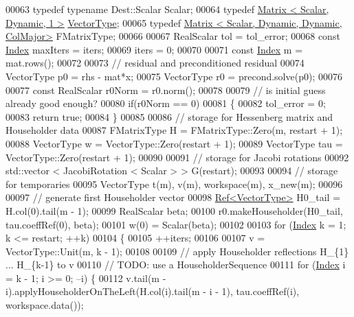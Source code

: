 \begin{DoxyCode}
00063   \textcolor{keyword}{typedef} \textcolor{keyword}{typename} Dest::Scalar Scalar;
00064   \textcolor{keyword}{typedef} \hyperlink{group___core___module}{Matrix < Scalar, Dynamic, 1 >} \hyperlink{struct_vector_type}{VectorType};
00065   \textcolor{keyword}{typedef} \hyperlink{group___core___module_class_eigen_1_1_matrix}{Matrix < Scalar, Dynamic, Dynamic, ColMajor>} 
      FMatrixType;
00066 
00067   RealScalar tol = tol\_error;
00068   \textcolor{keyword}{const} \hyperlink{namespace_eigen_a62e77e0933482dafde8fe197d9a2cfde}{Index} maxIters = iters;
00069   iters = 0;
00070 
00071   \textcolor{keyword}{const} \hyperlink{namespace_eigen_a62e77e0933482dafde8fe197d9a2cfde}{Index} m = mat.rows();
00072 
00073   \textcolor{comment}{// residual and preconditioned residual}
00074   VectorType p0 = rhs - mat*x;
00075   VectorType r0 = precond.solve(p0);
00076 
00077   \textcolor{keyword}{const} RealScalar r0Norm = r0.norm();
00078 
00079   \textcolor{comment}{// is initial guess already good enough?}
00080   \textcolor{keywordflow}{if}(r0Norm == 0)
00081   \{
00082     tol\_error = 0;
00083     \textcolor{keywordflow}{return} \textcolor{keyword}{true};
00084   \}
00085 
00086   \textcolor{comment}{// storage for Hessenberg matrix and Householder data}
00087   FMatrixType H   = FMatrixType::Zero(m, restart + 1);
00088   VectorType w    = VectorType::Zero(restart + 1);
00089   VectorType tau  = VectorType::Zero(restart + 1);
00090 
00091   \textcolor{comment}{// storage for Jacobi rotations}
00092   std::vector < JacobiRotation < Scalar > > G(restart);
00093   
00094   \textcolor{comment}{// storage for temporaries}
00095   VectorType t(m), v(m), workspace(m), x\_new(m);
00096 
00097   \textcolor{comment}{// generate first Householder vector}
00098   \hyperlink{group___core___module_class_eigen_1_1_ref}{Ref<VectorType>} H0\_tail = H.col(0).tail(m - 1);
00099   RealScalar beta;
00100   r0.makeHouseholder(H0\_tail, tau.coeffRef(0), beta);
00101   w(0) = Scalar(beta);
00102   
00103   \textcolor{keywordflow}{for} (\hyperlink{namespace_eigen_a62e77e0933482dafde8fe197d9a2cfde}{Index} k = 1; k <= restart; ++k)
00104   \{
00105     ++iters;
00106 
00107     v = VectorType::Unit(m, k - 1);
00108 
00109     \textcolor{comment}{// apply Householder reflections H\_\{1\} ... H\_\{k-1\} to v}
00110     \textcolor{comment}{// TODO: use a HouseholderSequence}
00111     \textcolor{keywordflow}{for} (\hyperlink{namespace_eigen_a62e77e0933482dafde8fe197d9a2cfde}{Index} i = k - 1; i >= 0; --i) \{
00112       v.tail(m - i).applyHouseholderOnTheLeft(H.col(i).tail(m - i - 1), tau.coeffRef(i), workspace.data());

\end{DoxyCode}
